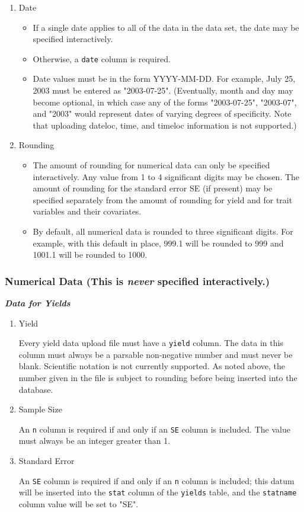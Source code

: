\begin{enumerate}
\item Date

\begin{itemize}
 \item If a single date applies to all of the data in the data set, the date may be specified interactively.
 \item Otherwise, a \verb|date| column is required.
 \item Date values must be in the form YYYY-MM-DD.  For example, July 25, 2003 must be entered as "2003-07-25".  (Eventually, month and day may become optional, in which case any of the forms "2003-07-25", "2003-07", and "2003" would represent dates of varying degrees of specificity.  Note that uploading dateloc, time, and timeloc information is not supported.)
\end{itemize}

\item Rounding

\begin{itemize}
 \item The amount of rounding for numerical data can only be specified
   interactively.  Any value from 1 to 4 significant digits may be chosen.
   The amount of rounding for the standard error SE (if present) may be
   specified separately from the amount of rounding for yield and for trait
   variables and their covariates.
 \item By default, all numerical data is rounded to three significant digits.
   For example, with this default in place, 999.1 will be rounded to 999 and
   1001.1 will be rounded to 1000.
\end{itemize}

\end{enumerate}

\subsubsection{Numerical Data  (This is \textit{never} specified interactively.)}

\textbf{\textit{Data for Yields}}

\begin{enumerate}
\item Yield
  
  Every yield data upload file must have a \verb|yield| column.  The data in
   this column must always be a parsable non-negative number and must never
   be blank.  Scientific notation is not currently supported.  As noted
   above, the number given in the file is subject to rounding before being
   inserted into the database.
\item Sample Size
  
 An \verb|n| column is required if and only if an \verb|SE| column is included.  The value must always be an integer greater than 1.
\item Standard Error
  
   An \verb|SE| column is required if and only if an \verb|n| column is included;
    this datum will be inserted into the \verb|stat| column of the \verb|yields| table,
    and the \verb|statname| column value will be set to "SE".
\end{enumerate}

